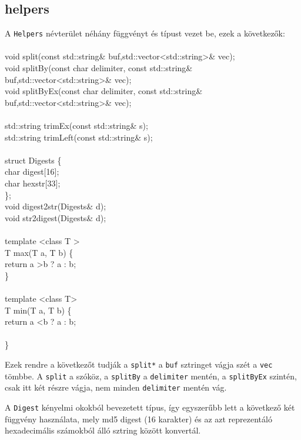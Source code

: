 \documentclass[fleqn,10pt,a4paper,titlepage]{article}
\begin{document}
  \subsection{helpers}
  A \texttt{Helpers} névterület néhány függvényt és típust vezet be, ezek a következők:\\\\
  void split(const std::string\& buf,std::vector\textless std::string\textgreater\& vec);\\
  void splitBy(const char delimiter, const std::string\& buf,std::vector\textless std::string\textgreater\& vec);\\
  void splitByEx(const char delimiter, const std::string\& buf,std::vector\textless std::string\textgreater\& vec);\\\\
  std::string trimEx(const std::string\& s);\\
  std::string trimLeft(const std::string\& s);\\
  \\
  struct Digests \{\\
    char digest[16];\\
    char hexstr[33];\\
  \};
  \\
  void digest2str(Digests\& d);\\
  void str2digest(Digests\& d);\\
  \\
  template \textless class T \textgreater\\
  T max(T a, T b) \{\\
  \hspace*{2mm} return a \textgreater b ? a : b;\\
  \}\\
  \\
  template \textless class T\textgreater\\
  T min(T a, T b) \{\\
  \hspace*{2mm}  return a \textless b ? a : b;\\\\
  \}

  Ezek rendre a következőt tudják a \texttt{split*} a \texttt{buf} sztringet vágja szét a \texttt{vec} tömbbe. A
  \texttt{split} a szóköz, a \texttt{splitBy} a \texttt{delimiter} mentén, a \texttt{splitByEx} szintén, csak itt két
  részre vágja, nem minden \texttt{delimiter} mentén vág.
  
  A \texttt{Digest} kényelmi okokból bevezetett típus, így egyszerűbb lett a következő két függvény használata, mely md5
  digest (16 karakter) és az azt reprezentáló hexadecimális számokból álló sztring között konvertál.
\end{document}
